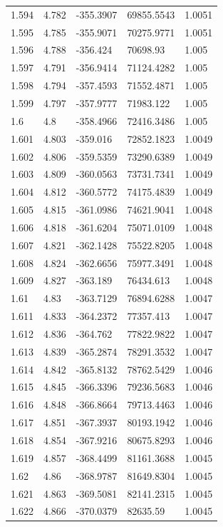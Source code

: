\begin{tabular}{lllll}
1.594 & 4.782 & -355.3907 & 69855.5543 & 1.0051 \\
1.595 & 4.785 & -355.9071 & 70275.9771 & 1.0051 \\
1.596 & 4.788 & -356.424 & 70698.93 & 1.005 \\
1.597 & 4.791 & -356.9414 & 71124.4282 & 1.005 \\
1.598 & 4.794 & -357.4593 & 71552.4871 & 1.005 \\
1.599 & 4.797 & -357.9777 & 71983.122 & 1.005 \\
1.6 & 4.8 & -358.4966 & 72416.3486 & 1.005 \\
1.601 & 4.803 & -359.016 & 72852.1823 & 1.0049 \\
1.602 & 4.806 & -359.5359 & 73290.6389 & 1.0049 \\
1.603 & 4.809 & -360.0563 & 73731.7341 & 1.0049 \\
1.604 & 4.812 & -360.5772 & 74175.4839 & 1.0049 \\
1.605 & 4.815 & -361.0986 & 74621.9041 & 1.0048 \\
1.606 & 4.818 & -361.6204 & 75071.0109 & 1.0048 \\
1.607 & 4.821 & -362.1428 & 75522.8205 & 1.0048 \\
1.608 & 4.824 & -362.6656 & 75977.3491 & 1.0048 \\
1.609 & 4.827 & -363.189 & 76434.613 & 1.0048 \\
1.61 & 4.83 & -363.7129 & 76894.6288 & 1.0047 \\
1.611 & 4.833 & -364.2372 & 77357.413 & 1.0047 \\
1.612 & 4.836 & -364.762 & 77822.9822 & 1.0047 \\
1.613 & 4.839 & -365.2874 & 78291.3532 & 1.0047 \\
1.614 & 4.842 & -365.8132 & 78762.5429 & 1.0046 \\
1.615 & 4.845 & -366.3396 & 79236.5683 & 1.0046 \\
1.616 & 4.848 & -366.8664 & 79713.4463 & 1.0046 \\
1.617 & 4.851 & -367.3937 & 80193.1942 & 1.0046 \\
1.618 & 4.854 & -367.9216 & 80675.8293 & 1.0046 \\
1.619 & 4.857 & -368.4499 & 81161.3688 & 1.0045 \\
1.62 & 4.86 & -368.9787 & 81649.8304 & 1.0045 \\
1.621 & 4.863 & -369.5081 & 82141.2315 & 1.0045 \\
1.622 & 4.866 & -370.0379 & 82635.59 & 1.0045 \\

\end{tabular}
